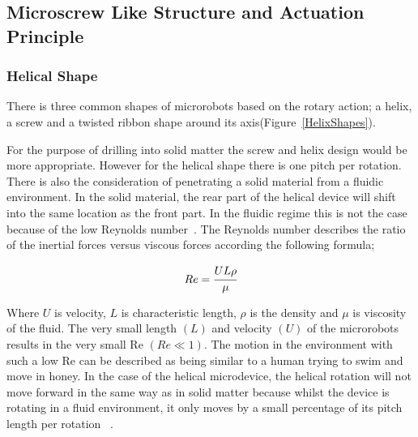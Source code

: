 \documentclass[a4paper,11pt]{article}
\begin{document}
\begin{sloppypar}
\subsection{Microscrew Like Structure and Actuation Principle}
\paragraph{}
\subsubsection{Helical Shape}

 There is three common shapes of microrobots 
based on the rotary action; a helix, a screw and a twisted ribbon shape around its axis(Figure~\ref{HelixShapes}). 


For the purpose of drilling into solid matter the screw and helix design would be more appropriate.
 However for the helical shape there is one pitch per rotation. There is also the consideration of penetrating
 a solid material from a fluidic environment. In the solid material, the rear part of the helical device will shift 
into the same location as the front part. In the fluidic regime this is not the case because of the low
 Reynolds number~\citep{peyer2013magnetic}. The Reynolds number describes the ratio of the inertial forces versus viscous 
forces according the following formula;

\begin{equation}
  Re = \cfrac{UL\rho}{\mu}
\label{eq:4}
\end{equation}
 
Where $ U$ is velocity, $L$ is characteristic length, $\rho$ is the density and $\mu$ is viscosity of the fluid.
The very small length $(L)$ and velocity $(U)$ of the microrobots results in the very small Re $(Re\ll1)$. 
The motion in the environment with such a low Re can be described as being similar to a human
 trying to swim and move in honey. In the case of the helical microdevice, the helical rotation will not move 
forward in the same way as in solid matter because whilst the device is rotating in a fluid environment, 
it only moves by a small percentage of its pitch length per rotation ~\citep{peyer2013magnetic}. 


\end{sloppypar}
\end{document}
